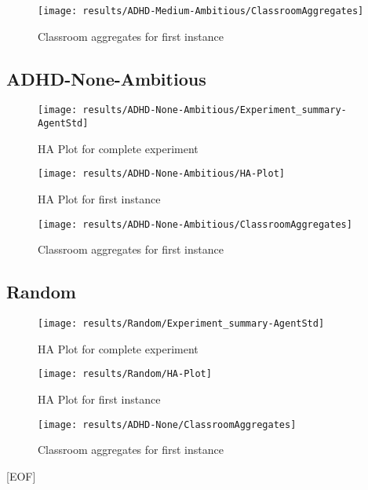 \begin{figure}[H]
    \centering
    \texttt{[image: results/ADHD-Medium-Ambitious/ClassroomAggregates]}
    \caption{Classroom aggregates for first instance}
\end{figure}

\subsection{ADHD-None-Ambitious}

\begin{figure}[H]
    \centering
    \texttt{[image: results/ADHD-None-Ambitious/Experiment\_summary-AgentStd]}
    \caption{HA Plot for complete experiment}
\end{figure}

\begin{figure}[H]
    \centering
    \texttt{[image: results/ADHD-None-Ambitious/HA-Plot]}
    \caption{HA Plot for first instance}
\end{figure}

\begin{figure}[H]
    \centering
    \texttt{[image: results/ADHD-None-Ambitious/ClassroomAggregates]}
    \caption{Classroom aggregates for first instance}
\end{figure}

\subsection{Random}

\begin{figure}[H]
    \centering
    \texttt{[image: results/Random/Experiment\_summary-AgentStd]}
    \caption{HA Plot for complete experiment}
\end{figure}

\begin{figure}[H]
    \centering
    \texttt{[image: results/Random/HA-Plot]}
    \caption{HA Plot for first instance}
\end{figure}

\begin{figure}[H]
    \centering
    \texttt{[image: results/ADHD-None/ClassroomAggregates]}
    \caption{Classroom aggregates for first instance}
\end{figure}

[EOF]
